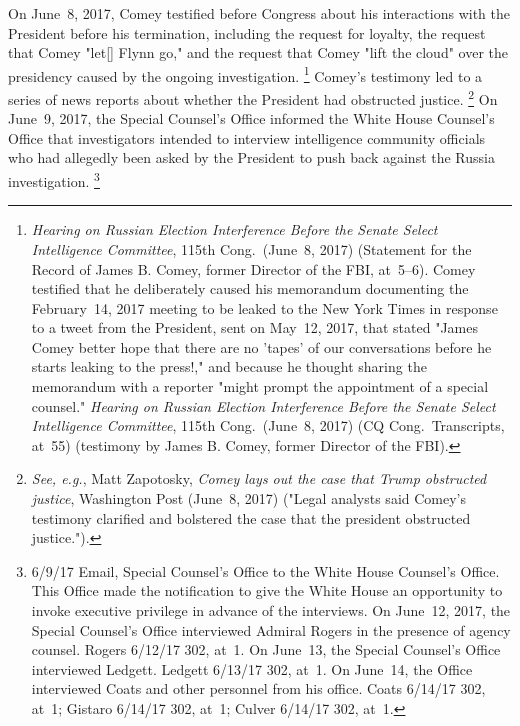 On June~8, 2017, Comey testified before Congress about his interactions with the President before his termination, including the request for loyalty, the request that Comey "let[] Flynn go," and the request that Comey "lift the cloud" over the presidency caused by the ongoing investigation.%
\footnote{\textit{Hearing on Russian Election Interference Before the Senate Select Intelligence Committee}, 115th Cong.\ (June~8, 2017) (Statement for the Record of James B. Comey, former Director of the FBI, at~5--6).
Comey testified that he deliberately caused his memorandum documenting the February~14, 2017 meeting to be leaked to the New York Times in response to a tweet from the President, sent on May~12, 2017, that stated "James Comey better hope that there are no 'tapes' of our conversations before he starts leaking to the press!," and because he thought sharing the memorandum with a reporter "might prompt the appointment of a special counsel."
\textit{Hearing on Russian Election Interference Before the Senate Select Intelligence Committee}, 115th Cong.\ (June~8, 2017) (CQ Cong.\ Transcripts, at~55) (testimony by James B. Comey, former Director of the FBI).}
Comey's testimony led to a series of news reports about whether the President had obstructed justice.%
\footnote{\textit{See, e.g.}, Matt Zapotosky, \textit{Comey lays out the case that Trump obstructed justice}, Washington Post (June~8, 2017) ("Legal analysts said Comey's testimony clarified and bolstered the case that the president obstructed justice.").}
On June~9, 2017, the Special Counsel's Office informed the White House Counsel's Office that investigators intended to interview intelligence community officials who had allegedly been asked by the President to push back against the Russia investigation.%
\footnote{6/9/17 Email, Special Counsel's Office to the White House Counsel's Office.
This Office made the notification to give the White House an opportunity to invoke executive privilege in advance of the interviews.
On June~12, 2017, the Special Counsel's Office interviewed Admiral Rogers in the presence of agency counsel.
Rogers 6/12/17 302, at~1.
On June~13, the Special Counsel's Office interviewed Ledgett.
Ledgett 6/13/17 302, at~1.
On June~14, the Office interviewed Coats and other personnel from his office.
Coats 6/14/17 302, at~1;
Gistaro 6/14/17 302, at~1;
Culver 6/14/17 302, at~1.}

